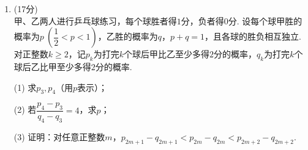 \documentclass[12pt,a4paper]{article}
\begin{document}
\begin{enumerate}[leftmargin=*,label=\arabic*.,resume,itemsep=1.2ex]
		(1) 证明：$f(x)$在区间$(0,+\infty)$存在唯一的极值点和唯一的零点；
		
		(2) 设$x_1,x_2$分别为$f(x)$在区间$(0,+\infty)$的极值点和零点.
		
		\hspace*{2em}(i) 设函数$g(t)=f(x_1+t)-f(x_1-t)$，证明：$g(t)$在区间$(0,x_1)$单调递减；
		
		\hspace*{2em}(ii) 比较$2x_1$与$x_2$的大小，并证明你的结论.
		
		\newpage
		\item (17分)\\
		甲、乙两人进行乒乓球练习，每个球胜者得$1$分，负者得$0$分. 设每个球甲胜的概率为$p\ \left(\dfrac12<p<1\right)$，乙胜的概率为$q$，$p+q=1$，且各球的胜负相互独立. 对正整数$k\ge2$，记$p_k$为打完$k$个球后甲比乙至少多得$2$分的概率，$q_k$为打完$k$个球后乙比甲至少多得$2$分的概率.
		
		(1) 求$p_3,p_4$（用$p$表示）；
		
		(2) 若$\dfrac{p_4-p_3}{q_4-q_3}=4$，求$p$；
		
		(3) 证明：对任意正整数$m$，$p_{2m+1}-q_{2m+1}<p_{2m}-q_{2m}<p_{2m+2}-q_{2m+2}$.
		
		\vspace{0.9\textheight}
	\end{enumerate}
\end{document}
